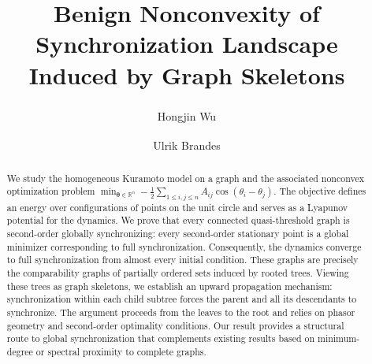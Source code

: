 \documentclass[11pt,reqno]{amsart}
\title[Benign Nonconvexity of Synchronization Landscape Induced by Graph Skeletons]{Benign Nonconvexity of Synchronization Landscape Induced by Graph Skeletons}
\author[Wu]{Hongjin Wu\textsuperscript{\normalfont *}}
\author[Brandes]{Ulrik Brandes\textsuperscript{\normalfont\textdagger}}
\theoremstyle{definition}
\begin{document}
\begin{abstract}
We study the homogeneous Kuramoto model on a graph and
the associated nonconvex optimization problem
$\min_{\boldsymbol{\theta}\in\mathbb{R}^n}
-\frac12\sum_{1\leq i,j\leq n}A_{ij}\cos(\theta_i-\theta_j)$.
The objective defines an energy over configurations of
points on the unit circle and serves as a Lyapunov potential
for the dynamics.
We prove that every connected quasi-threshold graph is
second-order globally synchronizing: every second-order
stationary point is a global minimizer corresponding to
full synchronization.
Consequently, the dynamics converge to full synchronization
from almost every initial condition.
These graphs are precisely the comparability graphs of
partially ordered sets induced by rooted trees.
Viewing these trees as graph skeletons, we establish an
upward propagation mechanism: synchronization within each
child subtree forces the parent and all its descendants
to synchronize.
The argument proceeds from the leaves to the root and
relies on phasor geometry and second-order optimality
conditions.
Our result provides a structural route to global
synchronization that complements existing results based
on minimum-degree or spectral proximity to complete graphs.
\end{abstract}

\maketitle
\tableofcontents
\end{document}
